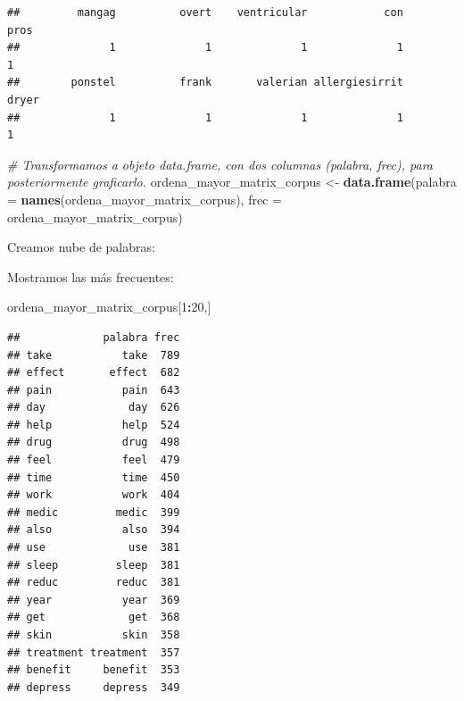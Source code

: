 \documentclass[spanish,]{article}
\newenvironment{Shaded}{\begin{snugshade}}{\end{snugshade}}
\newcommand{\CommentTok}[1]{\textcolor[rgb]{0.56,0.35,0.01}{\textit{#1}}}
\newcommand{\DataTypeTok}[1]{\textcolor[rgb]{0.13,0.29,0.53}{#1}}
\newcommand{\DecValTok}[1]{\textcolor[rgb]{0.00,0.00,0.81}{#1}}
\newcommand{\KeywordTok}[1]{\textcolor[rgb]{0.13,0.29,0.53}{\textbf{#1}}}
\newcommand{\NormalTok}[1]{#1}
\newcommand{\OperatorTok}[1]{\textcolor[rgb]{0.81,0.36,0.00}{\textbf{#1}}}
\newcommand{\StringTok}[1]{\textcolor[rgb]{0.31,0.60,0.02}{#1}}
\begin{document}
\begin{verbatim}
##         mangag          overt    ventricular            con           pros 
##              1              1              1              1              1 
##        ponstel          frank       valerian allergiesirrit          dryer 
##              1              1              1              1              1
\end{verbatim}

\begin{Shaded}
\begin{Highlighting}[]
\CommentTok{# Transformamos a objeto data.frame, con dos columnas (palabra, frec), para posteriormente graficarlo.}
\NormalTok{ordena_mayor_matrix_corpus <-}\StringTok{ }\KeywordTok{data.frame}\NormalTok{(}\DataTypeTok{palabra =} \KeywordTok{names}\NormalTok{(ordena_mayor_matrix_corpus), }\DataTypeTok{frec =}\NormalTok{ ordena_mayor_matrix_corpus)}
\end{Highlighting}
\end{Shaded}

Creamos nube de palabras:

\begin{Shaded}
\end{Shaded}

Mostramos las más frecuentes:

\begin{Shaded}
\begin{Highlighting}[]
\NormalTok{ordena_mayor_matrix_corpus[}\DecValTok{1}\OperatorTok{:}\DecValTok{20}\NormalTok{,]}
\end{Highlighting}
\end{Shaded}

\begin{verbatim}
##             palabra frec
## take           take  789
## effect       effect  682
## pain           pain  643
## day             day  626
## help           help  524
## drug           drug  498
## feel           feel  479
## time           time  450
## work           work  404
## medic         medic  399
## also           also  394
## use             use  381
## sleep         sleep  381
## reduc         reduc  381
## year           year  369
## get             get  368
## skin           skin  358
## treatment treatment  357
## benefit     benefit  353
## depress     depress  349
\end{verbatim}
\end{document}

